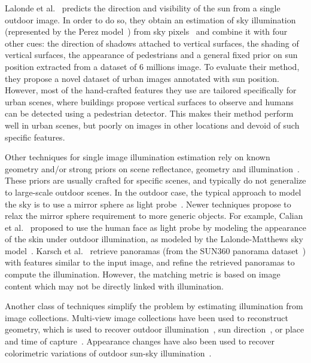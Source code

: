 Lalonde et al.~\cite{lalonde-ijcv-12} predicts the direction and visibility of the sun from a single outdoor image. In order to do so, they obtain an estimation of sky illumination (represented by the Perez model~\cite{perez1993allweather}) from sky pixels~\cite{lalonde-ijcv-10} and combine it with four other cues: the direction of shadows attached to vertical surfaces, the shading of vertical surfaces, the appearance of pedestrians and a general fixed prior on sun position extracted from a dataset of 6 millions image. To evaluate their method, they propose a novel dataset of urban images annotated with sun position. However, most of the hand-crafted features they use are tailored specifically for urban scenes, where buildings propose vertical surfaces to observe and humans can be detected using a pedestrian detector. This makes their method perform well in urban scenes, but poorly on images in other locations and devoid of such specific features. 

Other techniques for single image illumination estimation rely on known geometry and/or strong priors on scene reflectance, geometry and illumination~\cite{barron-pami-15,barron2013rgbd,lombardi2016reflectance}. These priors are usually crafted for specific scenes, and typically do not generalize to large-scale outdoor scenes. In the outdoor case, the typical approach to model the sky is to use a mirror sphere as light probe~\cite{debevec-siggraph-98}. Newer techniques propose to relax the mirror sphere requirement to more generic objects. For example, Calian et al.~\cite{calian2018face} proposed to use the human face as light probe by modeling the appearance of the skin under outdoor illumination, as modeled by the Lalonde-Matthews sky model~\cite{lalonde-3dv-14}. Karsch et al.~\cite{karsch2014automatic} retrieve panoramas (from the SUN360 panorama dataset~\cite{xiao-cvpr-12}) with features similar to the input image, and refine the retrieved panoramas to compute the illumination. However, the matching metric is based on image content which may not be directly linked with illumination. 

Another class of techniques simplify the problem by estimating illumination from image collections. Multi-view image collections have been used to reconstruct geometry, which is used to recover outdoor illumination~\cite{haber2009relighting,lalonde-3dv-14,shan2015visual,duchene2015multiview}, sun direction~\cite{wehrwein2015shadows}, or place and time of capture~\cite{hauagge2014outdoor}. Appearance changes have also been used to recover colorimetric variations of outdoor sun-sky illumination~\cite{sunkavalli2008color}. 

